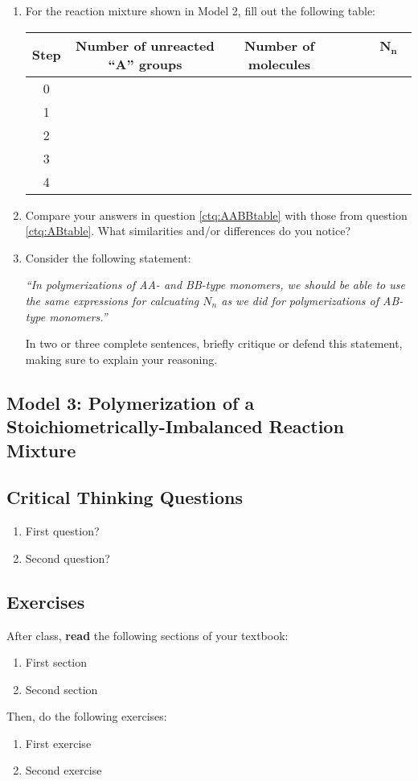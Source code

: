 	\begin{enumerate}
		\item \label{ctq:AABBtable} For the reaction mixture shown in Model 2, fill out the following table:
		
			\begin{table}[!h]
				\centering
				\renewcommand{\arraystretch}{3}
				\begin{tabular}{|c|c|c|c|}
					\hline
					\textbf{Step} &  \textbf{Number of unreacted ``A'' groups} & \textbf{Number of molecules} & ~~~~$\mathbf{N_n}$~~~~\\\hline
					0 &&& \\\hline
					1 &&& \\\hline
					2 &&& \\\hline
					3 &&& \\\hline
					4 &&& \\\hline
				\end{tabular}
			\end{table}
			
		\item Compare your answers in question \ref{ctq:AABBtable} with those from question \ref{ctq:ABtable}.  What similarities and/or differences do you notice?
		
		\item Consider the following statement:
		
			\emph{``In polymerizations of AA- and BB-type monomers, we should be able to use the same expressions for calcuating $N_n$ as we did for polymerizations of AB-type monomers.''}
			
			In two or three complete sentences, briefly critique or defend this statement, making sure to explain your reasoning.
			
	\end{enumerate}

\subsection{Model 3: Polymerization of a Stoichiometrically-Imbalanced Reaction Mixture}

\subsection{Critical Thinking Questions}

	\begin{enumerate}
		\item First question?
		\item Second question?
	\end{enumerate}

\subsection{Exercises}

	After class, \textbf{read} the following sections of your textbook:
	
	\begin{enumerate}
		\item First section
		\item Second section
	\end{enumerate}
	
	Then, do the following exercises:
	
	\begin{enumerate}
		\item First exercise
		\item Second exercise
	\end{enumerate}